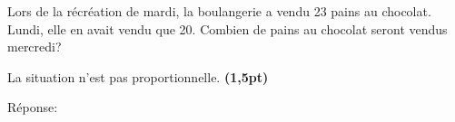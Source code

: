 
\question[2]
Lors de la récréation de mardi, la boulangerie a vendu 23 pains au chocolat. Lundi, elle en avait vendu que 20. Combien de pains au chocolat seront vendus mercredi?

\vspace{10pt}{\footnotesize\raggedleft Espace pour ta démarche et tes calculs\par}
\begin{solutionorgrid}[100pt]
La situation n'est pas proportionnelle.  \textbf{(1,5pt)}
\end{solutionorgrid}

\begin{tcolorbox}[enhanced jigsaw, interior hidden, colframe=box, parbox=false]%
Réponse: 
\end{tcolorbox}



